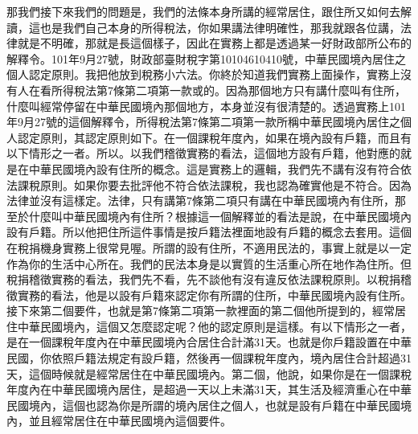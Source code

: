\documentclass[]{ctexbook}
\begin{document}
那我們接下來我們的問題是，我們的法條本身所講的經常居住，跟住所又如何去解讀，這也是我們自己本身的所得稅法，你如果講法律明確性，那我就跟各位講，法律就是不明確，那就是長這個樣子，因此在實務上都是透過某一好財政部所公布的解釋令。101年9月27號，財政部臺財稅字第10104610410號，中華民國境內居住之個人認定原則。我把他放到稅務小六法。你終於知道我們實務上面操作，實務上沒有人在看所得稅法第7條第二項第一款或的。因為那個地方只有講什麼叫有住所，什麼叫經常停留在中華民國境內那個地方，本身並沒有很清楚的。透過實務上101年9月27號的這個解釋令，所得稅法第7條第二項第一款所稱中華民國境內居住之個人認定原則，其認定原則如下。在一個課稅年度內，如果在境內設有戶籍，而且有以下情形之一者。所以。以我們稽徵實務的看法，這個地方設有戶籍，他對應的就是在中華民國境內設有住所的概念。這是實務上的邏輯，我們先不講有沒有符合依法課稅原則。如果你要去批評他不符合依法課稅，我也認為確實他是不符合。因為法律並沒有這樣定。法律，只有講第7條第二項只有講在中華民國境內有住所，那至於什麼叫中華民國境內有住所？根據這一個解釋並的看法是說，在中華民國境內設有戶籍。所以他把住所這件事情是按戶籍法裡面地設有戶籍的概念去套用。這個在稅捐機身實務上很常見喔。所謂的設有住所，不適用民法的，事實上就是以一定作為你的生活中心所在。我們的民法本身是以實質的生活重心所在地作為住所。但稅捐稽徵實務的看法，我們先不看，先不談他有沒有違反依法課稅原則。以稅捐稽徵實務的看法，他是以設有戶籍來認定你有所謂的住所，中華民國境內設有住所。接下來第二個要件，也就是第7條第二項第一款裡面的第二個他所提到的，經常居住中華民國境內，這個又怎麼認定呢？他的認定原則是這樣。有以下情形之一者，是在一個課稅年度內在中華民國境內合居住合計滿31天。也就是你戶籍設置在中華民國，你依照戶籍法規定有設戶籍，然後再一個課稅年度內，境內居住合計超過31天，這個時候就是經常居住在中華民國境內。第二個，他說，如果你是在一個課稅年度內在中華民國境內居住，是超過一天以上未滿31天，其生活及經濟重心在中華民國境內，這個也認為你是所謂的境內居住之個人，也就是設有戶籍在中華民國境內，並且經常居住在中華民國境內這個要件。
\end{document}
